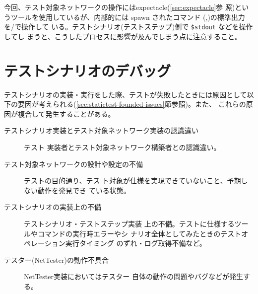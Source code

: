 今回、テスト対象ネットワークの操作にはexpectacle(\ref{sec:expectacle}参
照)というツールを使用しているが、内部的には spawn されたコマンド
(,)の標準出力を/で操作して
いる。テストシナリオ(テストステップ)側で \verb|$stdout| などを操作してし
まうと、こうしたプロセスに影響が及んでしまう点に注意すること。


 \section{テストシナリオのデバッグ}

テストシナリオの実装・実行をした際、テストが失敗したときには原因として以
下の要因が考えられる(\ref{sec:statictest-founded-issues}節参照)。また、
これらの原因が複合して発生することがある。
\begin{description}
 \item[テストシナリオ実装とテスト対象ネットワーク実装の認識違い] テスト
            実装者とテスト対象ネットワーク構築者との認識違い。
 \item[テスト対象ネットワークの設計や設定の不備] テストの目的通り、テス
            ト対象が仕様を実現できていないこと、予期しない動作を発見でき
            ている状態。
 \item[テストシナリオの実装上の不備] テストシナリオ・テストステップ実装
            上の不備。テストに仕様するツールやコマンドの実行時エラーやシ
            ナリオ全体としてみたときのテストオペレーション実行タイミング
            のずれ・ログ取得不備など。
 \item[テスター(NetTester)の動作不具合] NetTester実装においてはテスター
            自体の動作の問題やバグなどが発生する。
\end{description}


